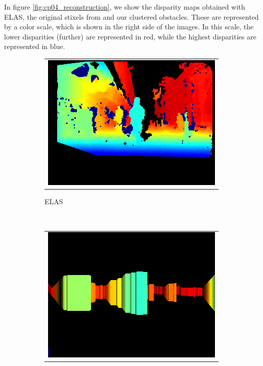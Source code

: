 In figure \ref{fig:cp04_reconstruction}, we show the disparity maps obtained with \ac{ELAS}, the original stixels from \cite{benenson2011stixels} and our clustered obstacles. These are represented by a color scale, which is shown in the right side of the images. In this scale, the lower disparities (further) are represented in red, while the highest disparities are represented in blue.
\begin{figure}[h!]
        \centering
        \begin{subfigure}[b]{0.29\textwidth}
	  \begin{tabular}{c}
	    \includegraphics[height=0.375\figuresheight]{elas}
	  \end{tabular}
	  \caption{ELAS}\label{fig:cp04_reconstruction_elas}
        \end{subfigure}%
        ~~~
        \begin{subfigure}[b]{0.29\textwidth}
	  \begin{tabular}{c}
	    \includegraphics[height=0.375\figuresheight]{stixels}

\end{tabular}
\end{subfigure}
\end{figure}
